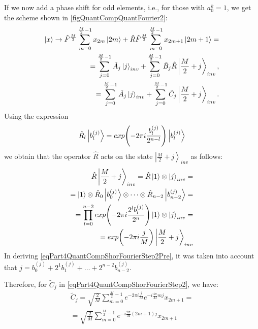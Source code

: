 

If we now add a phase shift for odd elements, i.e., for those with $a_0^k = 1$, we get the scheme shown in \autoref{figQuantCompQuantFourier2}: 
\begin{eqnarray}
\ket{x} \rightarrow
\hat{F}^{\frac{M}{2}} \sum_{m = 0}^{\frac{M}{2} - 1}x_{2m} \ket{2m} +
\hat{R}\hat{F}^{\frac{M}{2}} \sum_{m = 0}^{\frac{M}{2} - 1} x_{2m + 1}
\ket{2m+1} =
\nonumber \\
= 
\sum^{\frac{M}{2} - 1}_{j = 0} \tilde{A}_{j} \ket{j}_{inv} +
\sum^{\frac{M}{2} - 1}_{j = 0}  
\tilde{B}_{j} \hat{R}\left|\frac{M}{2} + j\right>_{inv},
\nonumber \\
= 
\sum^{\frac{M}{2} - 1}_{j = 0}  \tilde{A}_{j} \ket{j}_{inv} +
\sum^{\frac{M}{2} - 1}_{j = 0}  
\tilde{C}_{j} \left|\frac{M}{2} + j\right>_{inv}.
\label{eqPart4QuantCompShorFourierStep2}
\end{eqnarray}
Using the expression
\begin{equation}
\hat{R}_l \ket{b^{(j)}_l} = 
exp{\left(- 2 \pi i \frac{b^{(j)}_l}{2^{n-l}}\right)}
\ket{b^{(j)}_l}
\nonumber
\end{equation}
we obtain that the operator $\hat{R}$ acts on the state $\left|\frac{M}{2} + j\right>_{inv}$ as follows:
\begin{eqnarray}
\hat{R}\left|\frac{M}{2} + j\right>_{inv} = 
\hat{R}\ket{1} \otimes  \ket{j}_{inv} = 
\nonumber \\
= 
\ket{1} \otimes \hat{R}_0 \ket{b^{(j)}_0}
\otimes \cdots \otimes \hat{R}_{n-2} \ket{b^{(j)}_{n-2}} = 
\nonumber \\
= 
\prod_{l = 0}^{n-2}exp{\left(- 2 \pi i \frac{2^lb^{(j)}_l}{2^n}\right)}
\ket{1} \otimes \ket{j}_{inv} = 
\nonumber \\
=
exp{\left(-2 \pi i \frac{j}{M}\right)}
\left|\frac{M}{2} + j\right>_{inv} 
\label{eqPart4QuantCompShorFourierStep2Pre}
\end{eqnarray}
In deriving \eqref{eqPart4QuantCompShorFourierStep2Pre}, it was taken into account that $j = b^{(j)}_0 + 2^1 b^{(j)}_1 + \dots + 2^{n-2} b^{(j)}_{n-2}$. 

Therefore, for $\tilde{C}_{j}$ in \eqref{eqPart4QuantCompShorFourierStep2}, we have:
\begin{eqnarray}
\tilde{C}_{j} = 
\sqrt{\frac{2}{M}} 
\sum_{m = 0}^{\frac{M}{2} - 1} 
e^{- 2 \pi i \frac{j}{M}}
e^{-i \frac{4 \pi}{M} m j} x_{2m+1} =
\nonumber \\
=
\sqrt{\frac{2}{M}} 
\sum_{m = 0}^{\frac{M}{2} - 1} 
e^{-i \frac{2 \pi}{M} \left(2m+1\right) j} x_{2m+1}
\label{eqPart4QuantCompShorC}
\end{eqnarray}

